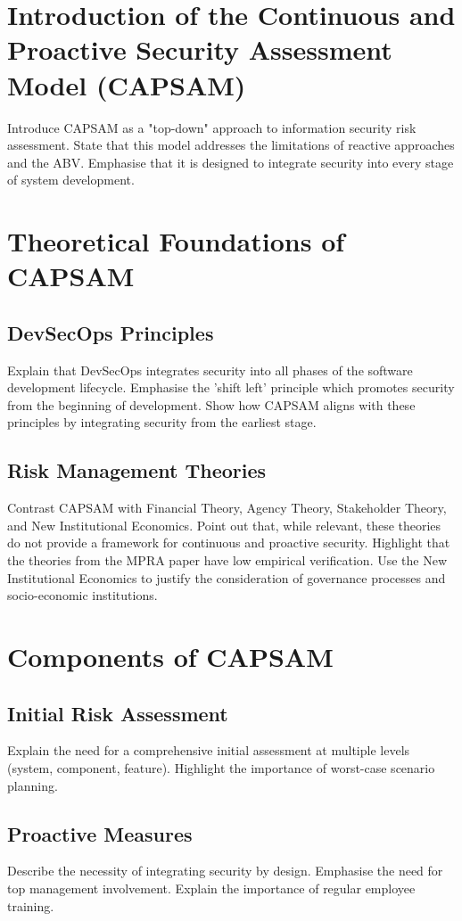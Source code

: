 \section{Introduction of the Continuous and Proactive Security Assessment Model (CAPSAM)}
Introduce CAPSAM as a "top-down" approach to information security risk assessment. State that this model addresses the limitations of reactive approaches and the ABV. Emphasise that it is designed to integrate security into every stage of system development.

\section{Theoretical Foundations of CAPSAM}
\subsection{DevSecOps Principles}
Explain that DevSecOps integrates security into all phases of the software development lifecycle. Emphasise the 'shift left' principle which promotes security from the beginning of development. Show how CAPSAM aligns with these principles by integrating security from the earliest stage.
\subsection{Risk Management Theories}
Contrast CAPSAM with Financial Theory, Agency Theory, Stakeholder Theory, and New Institutional Economics. Point out that, while relevant, these theories do not provide a framework for continuous and proactive security. Highlight that the theories from the MPRA paper have low empirical verification. Use the New Institutional Economics to justify the consideration of governance processes and socio-economic institutions.

\section{Components of CAPSAM}
\subsection{Initial Risk Assessment}
Explain the need for a comprehensive initial assessment at multiple levels (system, component, feature). Highlight the importance of worst-case scenario planning.
\subsection{Proactive Measures}
Describe the necessity of integrating security by design. Emphasise the need for top management involvement. Explain the importance of regular employee training.
